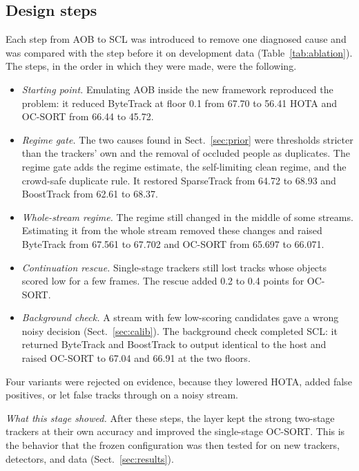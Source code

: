 \documentclass[pdflatex,sn-mathphys-num,iicol]{sn-jnl}
\newcommand{\scl}{SCL}
\newcommand{\aob}{AOB}
\begin{document}
\subsection{Design steps}\label{sec:steps}
Each step from \aob{} to \scl{} was introduced to remove one diagnosed cause
and was compared with the step before it on development data
(Table~\ref{tab:ablation}). The steps, in the order in which they were made,
were the following.
\begin{itemize}
\item \emph{Starting point.} Emulating \aob{} inside the new framework
      reproduced the problem: it reduced ByteTrack at floor 0.1 from 67.70 to
      56.41 HOTA and OC-SORT from 66.44 to 45.72.
\item \emph{Regime gate.} The two causes found in Sect.~\ref{sec:prior} were
      thresholds stricter than the trackers' own and the removal of occluded
      people as duplicates. The regime gate adds the regime
      estimate, the self-limiting clean regime, and the crowd-safe duplicate
      rule. It restored SparseTrack from 64.72 to 68.93 and BoostTrack from
      62.61 to 68.37.
\item \emph{Whole-stream regime.} The regime still changed in the middle of
      some streams. Estimating it from the whole stream removed these changes
      and raised ByteTrack from 67.561 to 67.702 and OC-SORT from 65.697 to
      66.071.
\item \emph{Continuation rescue.} Single-stage trackers still lost tracks
      whose objects scored low for a few frames. The rescue added 0.2 to 0.4
      points for OC-SORT.
\item \emph{Background check.} A stream with few low-scoring candidates gave a
      wrong noisy decision (Sect.~\ref{sec:calib}). The background check
      completed \scl{}: it returned ByteTrack and BoostTrack to output
      identical to the host and raised OC-SORT to 67.04 and 66.91 at the two
      floors.
\end{itemize}
Four variants were rejected on evidence, because they lowered HOTA, added
false positives, or let false tracks through on a noisy stream.

\emph{What this stage showed.} After these steps, the layer kept the strong
two-stage trackers at their own accuracy and improved the single-stage
OC-SORT. This is the behavior that the frozen configuration was then tested
for on new trackers, detectors, and data (Sect.~\ref{sec:results}).
\end{document}
